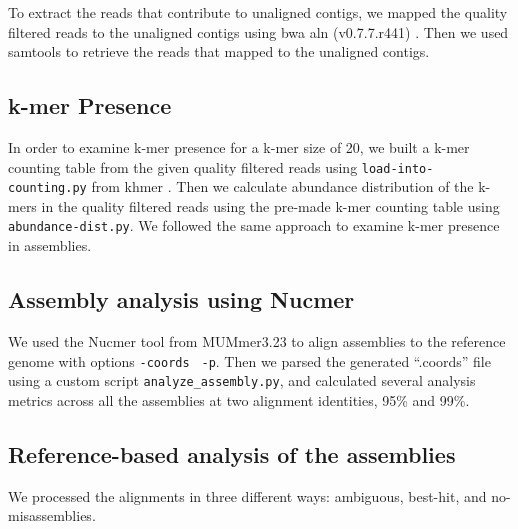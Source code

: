 \documentclass[10pt,a4paper,twocolumn]{article}
\begin{document}
To extract the reads that contribute to unaligned contigs, we mapped
the quality filtered reads to the unaligned contigs using bwa aln
(v0.7.7.r441) \cite{bwa}.  Then we used samtools to retrieve the reads
that mapped to the unaligned contigs.





\subsection*{k-mer Presence}
In order to examine k-mer presence for a k-mer size of 20, we built a
k-mer counting table from the given quality filtered reads using
{\tt{load-into-counting.py}} from khmer \cite{khmer2016}. Then we
calculate abundance distribution of the k-mers in the quality filtered
reads using the pre-made k-mer counting table using
{\tt{abundance-dist.py}}. We followed the same approach to examine
k-mer presence in assemblies.

\subsection*{Assembly analysis using Nucmer}

We used the Nucmer tool from MUMmer3.23 \cite{mummer3.0} to align
assemblies to the reference genome with options {\tt \--coords} {\tt
  -p}. Then we parsed the generated ``.coords'' file using a custom
script {\tt{analyze\_assembly.py}}, and calculated several analysis
metrics across all the assemblies at two alignment identities, 95\% and 99\%.

\subsection*{Reference-based analysis of the assemblies}
We processed the alignments in three different ways: ambiguous,
best-hit, and no-misassemblies.

\end{document}
